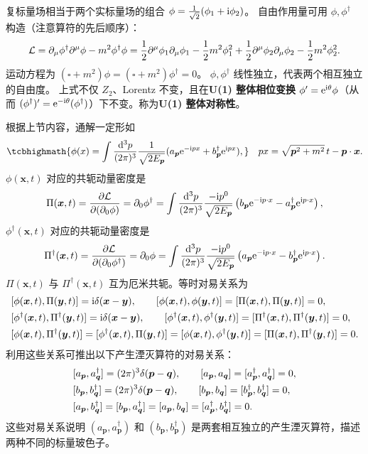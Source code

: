 复标量场相当于两个实标量场的组合 $\phi=\frac{1}{\sqrt{2}}(\phi_1+\mathrm{i} \phi_2)$。
自由作用量可用 $\phi,\phi^\dagger$ 构造（注意算符的先后顺序）：
\[\mathcal{L}=\partial_\mu\phi^\dagger\partial^\mu\phi-m^2\phi^\dagger\phi = \frac 12\partial^\mu\phi_1\partial_\mu\phi_1 - \frac 12 m^2\phi_1^2 +\frac 12\partial^\mu\phi_2\partial_\mu\phi_2 - \frac 12 m^2\phi_2^2.\]
运动方程为 $(\square+m^2)\phi=(\square+m^2)\phi^\dagger=0$。
$\phi,\phi^\dagger$ 线性独立，代表两个相互独立的自由度。
上式不仅 $Z_2$、Lorentz 不变，且在\textbf{U(1) 整体相位变换} $\phi' =\mathrm{e}^{\mathrm{i} \theta} \phi$（从而 $(\phi^\dagger)'= \mathrm{e}^{-\mathrm{i} \theta} (\phi^\dagger)$）下不变。称为\textbf{U(1) 整体对称性}。

根据上节内容，通解一定形如
\[
    \tcbhighmath{\phi(x) = \int\frac{\d[3]p}{(2\pi)^3}\frac{1}{\sqrt{2E_{\bm p}}} (a_{\bm p} \e^{-\i px} + b^\dagger_{\bm p} \e^{\i px} ),}\quad px = \sqrt{\bm p^2+m^2}\, t - \bm p\cdot \bm x.
\]
$\phi(\bm{x},t)$ 对应的共轭动量密度是
\begin{equation}
  \Pi(\bm{x},t)
  = \pdv{\mathcal{L}}{(\partial_0\phi)}
  = \partial_0\phi^\dagger
  = \int\frac{\dd^3p}{(2\pi)^3}\frac{-\mathrm{i} p^0}{\sqrt{2E_{\bm{p}}}}
     \left(b_{\bm{p}}\mathrm{e}^{-\mathrm{i} p\cdot x}
     -a^\dagger_{\bm{p}}\mathrm{e}^{\mathrm{i} p\cdot x}\right),
\end{equation}
$\phi^\dagger(\bm{x},t)$ 对应的共轭动量密度是
\begin{equation}
  \Pi^\dagger(\bm{x},t)
  = \pdv{\mathcal{L}}{(\partial_0\phi^\dagger)}
  = \partial_0\phi
  = \int\frac{\dd^3p}{(2\pi)^3}\frac{-\mathrm{i} p^0}{\sqrt{2E_{\bm{p}}}}
     \left(a_{\bm{p}}\mathrm{e}^{-\mathrm{i} p\cdot x}
     -b^\dagger_{\bm{p}}\mathrm{e}^{\mathrm{i} p\cdot x}\right).
\end{equation}
$\Pi(\bm{x},t)$ 与 $\Pi^\dagger(\bm{x},t)$ 互为厄米共轭。等时对易关系为
\begin{align}
  &[\phi(\bm{x},t),\Pi(\bm{y},t)]=\mathrm{i}\delta(\bm{x}-\bm{y}),
  \qquad
  [\phi(\bm{x},t),\phi(\bm{y},t)]
  =[\Pi(\bm{x},t),\Pi(\bm{y},t)]=0,\notag\\
  &[\phi^\dagger(\bm{x},t),\Pi^\dagger(\bm{y},t)]
  =\mathrm{i}\delta(\bm{x}-\bm{y}),
  \qquad
  [\phi^\dagger(\bm{x},t),\phi^\dagger(\bm{y},t)]
  =[\Pi^\dagger(\bm{x},t),\Pi^\dagger(\bm{y},t)]=0,\notag\\
  &[\phi(\bm{x},t),\Pi^\dagger(\bm{y},t)]
  =[\phi^\dagger(\bm{x},t),\Pi(\bm{y},t)]
  =[\phi(\bm{x},t),\phi^\dagger(\bm{y},t)]
  =[\Pi(\bm{x},t),\Pi^\dagger(\bm{y},t)]=0.
\end{align}
利用这些关系可推出以下产生湮灭算符的对易关系：
\begin{align}
  &[a_{\bm{p}},a^\dagger_{\bm{q}}]=(2\pi)^3\delta(\bm{p}-\bm{q}),
  \qquad
  [a_{\bm{p}},a_{\bm{q}}]=[a^\dagger_{\bm{p}},a^\dagger_{\bm{q}}]=0,\notag\\
  &[b_{\bm{p}},b^\dagger_{\bm{q}}]=(2\pi)^3\delta(\bm{p}-\bm{q}),
  \qquad
  [b_{\bm{p}},b_{\bm{q}}]=[b^\dagger_{\bm{p}},b^\dagger_{\bm{q}}]=0,\notag\\
  &[a_{\bm{p}},b^\dagger_{\bm{q}}]
  =[b_{\bm{p}},a^\dagger_{\bm{q}}]
  =[a_{\bm{p}},b_{\bm{q}}]
  =[a^\dagger_{\bm{p}},b^\dagger_{\bm{q}}]=0.
\end{align}
这些对易关系说明 $(a_{\bm{p}},a^\dagger_{\bm{p}})$ 和 $(b_{\bm{p}},b^\dagger_{\bm{p}})$ 是两套相互独立的产生湮灭算符，描述两种不同的标量玻色子。

